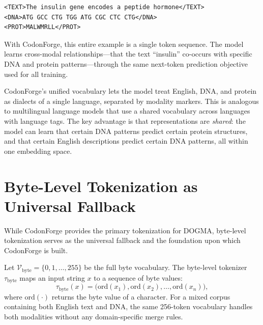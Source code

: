 \begin{verbatim}
<TEXT>The insulin gene encodes a peptide hormone</TEXT>
<DNA>ATG GCC CTG TGG ATG CGC CTC CTG</DNA>
<PROT>MALWMRLL</PROT>
\end{verbatim}

\noindent
With CodonForge, this entire example is a single token sequence. The model learns cross-modal relationships---that the text ``insulin'' co-occurs with specific DNA and protein patterns---through the same next-token prediction objective used for all training.

\begin{keyinsight}
CodonForge's unified vocabulary lets the model treat English, DNA, and protein as dialects of a single language, separated by modality markers. This is analogous to multilingual language models that use a shared vocabulary across languages with language tags. The key advantage is that representations are \emph{shared}: the model can learn that certain DNA patterns predict certain protein structures, and that certain English descriptions predict certain DNA patterns, all within one embedding space.
\end{keyinsight}

\section{Byte-Level Tokenization as Universal Fallback}
\label{sec:byte-tokenization}

While CodonForge provides the primary tokenization for DOGMA, byte-level tokenization serves as the universal fallback and the foundation upon which CodonForge is built.

\begin{dogmadef}
Let $\mathcal{V}_{\text{byte}} = \{0, 1, \ldots, 255\}$ be the full byte vocabulary. The byte-level tokenizer $\tau_{\text{byte}}$ maps an input string $x$ to a sequence of byte values:
\begin{equation}
\tau_{\text{byte}}(x) = \bigl(\text{ord}(x_1), \text{ord}(x_2), \ldots, \text{ord}(x_n)\bigr),
\end{equation}
where $\text{ord}(\cdot)$ returns the byte value of a character. For a mixed corpus containing both English text and DNA, the same 256-token vocabulary handles both modalities without any domain-specific merge rules.
\end{dogmadef}


